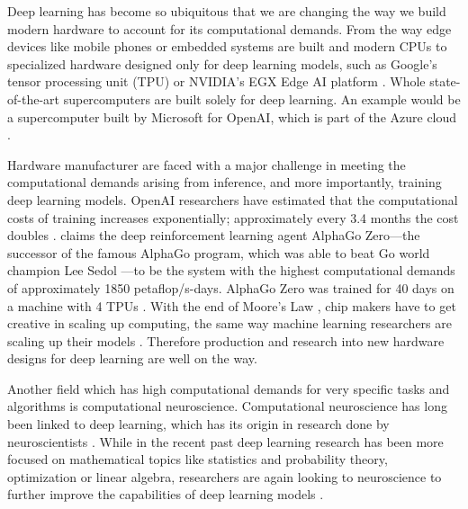 \documentclass[]{article}
\begin{document}
Deep learning has become so ubiquitous that we are changing the
way we build modern hardware to account for its computational demands.
From the way edge devices like mobile phones or embedded systems are
built \citep{deng_2019} and modern CPUs \citep{perez_2017} to
specialized hardware designed only for deep learning models, such
as Google's tensor processing unit (TPU) \citep{jouppi_et_al_2017} or
NVIDIA's EGX Edge AI platform \citep{boitano_2020}.
Whole state-of-the-art supercomputers are built solely for deep
learning.
An example would be a supercomputer built by Microsoft for OpenAI,
which is part of the Azure cloud \citep{langston_2020}.

Hardware manufacturer are faced with a major challenge in meeting the
computational demands arising from inference, and more importantly,
training deep learning models.
OpenAI researchers have estimated that the computational costs of
training increases exponentially; approximately every 3.4 months the
cost doubles \citep{amodei_et_al_2019}.
\citet{amodei_et_al_2019} claims the deep reinforcement learning agent
AlphaGo Zero---the successor of the famous AlphaGo program, which
was able to beat Go world champion Lee Sedol
\citep{silver_et_al_2017}---to be the system  with the highest
computational demands of approximately 1850 petaflop/s-days.
AlphaGo Zero was trained for 40 days on a machine with 4 TPUs
\citep{silver_et_al_2017}.
With the end of Moore's Law \citep{loeffler_2018}, chip makers have to
get creative in scaling up computing, the same way machine learning
researchers are scaling up their models \citep{simonite_2016}.
Therefore production and research into new hardware designs for deep
learning are well on the way.

Another field which has high computational demands for very specific
tasks and algorithms is computational neuroscience.
Computational neuroscience has long been linked to deep learning,
which has its origin in research done by neuroscientists
\citep{goodfellow_et_al_2016, mcculloch_et_al_1943}.
While in the recent past deep learning research has been more focused
on mathematical topics like statistics and probability theory,
optimization or linear algebra, researchers are again looking to
neuroscience to further improve the capabilities of deep
learning models \citep{marblestone_et_al_2016}.
\end{document}
